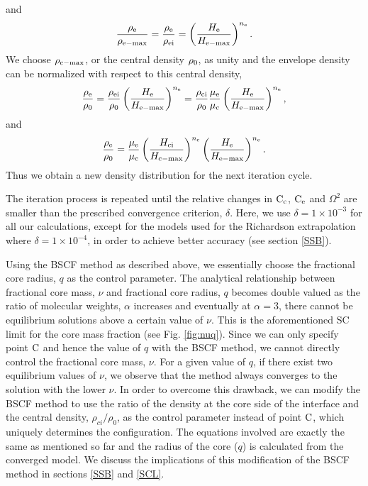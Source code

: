 \documentclass[a4paper,fleqn,usenatbib]{mnras}
\begin{document}
and
\begin{equation}
\frac{\rho_{\rm e}}{\rho_{\rm e-max}}=\frac{\rho_{\rm e}}{\rho_{\rm ei}}=\left( \frac{H_{\rm e}}{H_{\rm e-max}} \right)^{n_{\rm e}}.
\end{equation}
We choose $\rho_{\rm c-max}$, or the central density $\rho_{\rm 0}$, as unity and the envelope density can be normalized with respect to this central density,
\begin{equation}
\frac{\rho_{\rm e}}{\rho_{\rm 0}}=\frac{\rho_{\rm ei}}{\rho_{\rm 0}}\left( \frac{H_{\rm e}}{H_{\rm e-max}} \right)^{n_{\rm e}}
=\frac{\rho_{\rm ci}}{\rho_{\rm 0}}  \frac{\mu_{\rm e}}{\mu_{\rm c}} \left( \frac{H_{\rm e}}{H_{\rm e-max}}\right)^{n_{\rm e}} ,
\end{equation}
and
\begin{equation}
\frac{\rho_{\rm e}}{\rho_{\rm 0}}=\frac{\mu_{\rm e}}{\mu_{\rm c}} \left(\frac{H_{\rm ci}}{H_{\rm c-max}} \right)^{n_{\rm c}} 
\left( \frac{H_{\rm e}}{H_{\rm e-max}}\right)^{n_{\rm e}} . 
\end{equation}
Thus we obtain a new density distribution for the next iteration cycle. 

The iteration process is repeated until the relative changes in $\rm C_{c}$, $\rm C_{e}$ and $\Omega^2$ are smaller than the prescribed convergence criterion, $\delta$. Here, we use $\delta =1 \times 10^{-3}$ for all our calculations, except for the models used for the Richardson extrapolation where $\delta =1 \times 10^{-4}$, in order to achieve better accuracy (see section \ref{SSB}).

Using the BSCF method as described above, we essentially choose the fractional core radius, $q$ as the control parameter.
The analytical relationship between fractional core mass, $\nu$ and fractional core radius, $q$ becomes double valued as the ratio of molecular weights, $\alpha$ increases and eventually at $\alpha = 3$, there cannot be equilibrium solutions above a certain value of $\nu$. This is the aforementioned SC limit for the core mass fraction (see Fig. \ref{fig:nuq}). 
Since we can only specify point $\rm C$ and hence the value of $q$ with the BSCF method, we cannot directly control the fractional core mass, $\nu$. For a given value of $q$, if there exist two equilibrium values of $\nu$, we observe that the method always converges to the solution with the lower $\nu$.
In order to overcome this drawback, we can modify the BSCF method to use the ratio of the density at the core side of the interface and the central density, $\rho_{ci}/ \rho_0$, as the control parameter instead of point $\rm C$, which uniquely determines the configuration. The equations involved are exactly the same as mentioned so far and the radius of the core ($q$) is calculated from the converged model. We discuss the implications of this modification of the BSCF method in sections \ref{SSB} and \ref{SCL}. 
\end{document}
